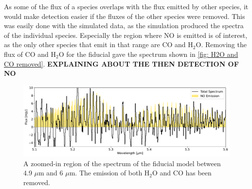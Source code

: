 \documentclass[twoside, single, authoryear, semicolon, 12pt]{lion-msc}
\newcommand{\4}{$_4$}
\newcommand{\3}{$_3$}
\newcommand{\2}{$_2$}
\begin{document}





As some of the flux of a species overlaps with the flux emitted by other species, it would make detection easier if the fluxes of the other species were removed. This was easily done with the simulated data, as the simulation produced the spectra of the individual species. Especially the region where NO is emitted is of interest, as the only other species that emit in that range are CO and H\2O. Removing the flux of CO and H\2O for the fiducial gave the spectrum shown in \autoref{fig: H2O and CO removed}. \textbf{EXPLAINING ABOUT THE THEN DETECTION OF NO}

\begin{figure}
    \centering
    \includegraphics[width=\linewidth]{Figures/H2O_CO_removed.pdf}
    \caption{A zoomed-in region of the spectrum of the fiducial model between 4.9 $\mu$m and 6 $\mu$m. The emission of both H\2O and CO has been removed.}
    \label{fig: H2O and CO removed}
\end{figure}
\end{document}
